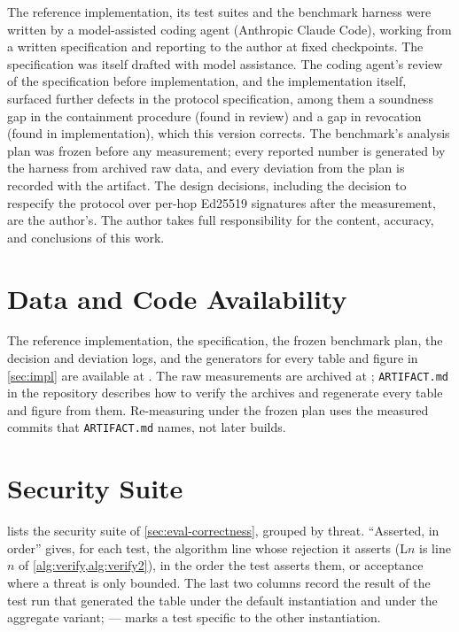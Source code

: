 \documentclass[11pt,a4paper]{article}
\begin{document}
The reference implementation, its test suites and the benchmark harness
were written by a model-assisted coding agent (Anthropic Claude Code),
working from a written specification and reporting to the author at
fixed checkpoints. The specification was itself drafted with model
assistance. The coding agent's review of the
specification before implementation, and the implementation itself,
surfaced further defects in the protocol specification, among them a
soundness gap in the containment procedure (found in review) and a gap
in revocation (found in implementation), which this version corrects. The benchmark's
analysis plan was frozen before any measurement; every reported number
is generated by the harness from archived raw data, and every deviation
from the plan is recorded with the artifact. The design decisions,
including the decision to respecify the protocol over per-hop Ed25519
signatures after the measurement, are the author's. The author takes
full responsibility for the content, accuracy, and conclusions of this
work.

\section*{Data and Code Availability}
\label{sec:data-availability}

The reference implementation, the specification, the frozen benchmark
plan, the decision and deviation logs, and the generators for every
table and figure in \cref{sec:impl} are available at \repourl{}. The raw
measurements are archived at \artifactdoi{}; \texttt{ARTIFACT.md} in
the repository describes how to verify the archives and regenerate every
table and figure from them. Re-measuring under the frozen plan uses the
measured commits that \texttt{ARTIFACT.md} names, not later builds.

\printbibliography

\appendix
{}

\section{Security Suite}
\label{app:security-suite}

 lists the security suite of
\cref{sec:eval-correctness}, grouped by threat. ``Asserted, in order''
gives, for each test, the algorithm line whose rejection it asserts
(L$n$ is line $n$ of \cref{alg:verify,alg:verify2}), in the order the
test asserts them, or acceptance where a threat is only bounded. The
last two columns record the result of the test run that generated the
table under the default instantiation and under the aggregate variant;
--- marks a test specific to the other instantiation.
\end{document}
